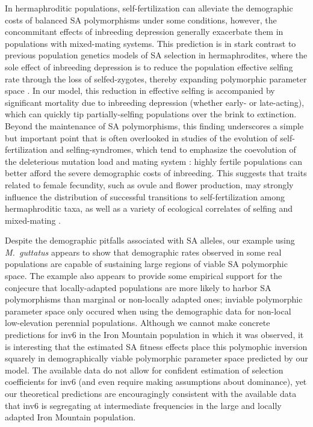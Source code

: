 \documentclass[11pt]{article}
\begin{document}
In hermaphroditic populations, self-fertilization can alleviate the demographic costs of balanced SA polymorphisms under some conditions, however, the concommitant effects of inbreeding depression generally exacerbate them in populations with mixed-mating systems. This prediction is in stark contrast to previous population genetics models of SA selection in hermaphrodites, where the sole effect of inbreeding depression is to reduce the population effective selfing rate through the loss of selfed-zygotes, thereby expanding polymorphic parameter space \citep{JordanConnallon2014, Olito2017}. In our model, this reduction in effective selfing is accompanied by significant mortality due to inbreeding depression (whether early- or late-acting), which can quickly tip partially-selfing populations over the brink to extinction. Beyond the maintenance of SA polymorphisms, this finding underscores a simple but important point that is often overlooked in studies of the evolution of self-fertilization and selfing-syndromes, which tend to emphasize the coevolution of the deleterious mutation load and mating system \citep[e.g.,][]{Charlesworth1987, LandeSchemske1985, Goodwillie2005}: highly fertile populations can better afford the severe demographic costs of inbreeding. This suggests that traits related to female fecundity, such as ovule and flower production, may strongly influence the distribution of successful transitions to self-fertilization among hermaphroditic taxa, as well as a variety of ecological correlates of selfing and mixed-mating \citep{Goodwillie2005, Igic2006, Grossenbacher2015}.

Despite the demographic pitfalls associated with SA alleles, our example using {\itshape M.~guttatus} appears to show that demographic rates observed in some real populations are capable of sustaining large regions of viable SA polymorphic space. The example also appears to provide some empirical support for the conjecure that locally-adapted populations are more likely to harbor SA polymorphisms than marginal or non-locally adapted ones; inviable polymorphic parameter space only occured when using the demographic data for non-local low-elevation perennial populations. Although we cannot make concrete predictions for inv6 in the Iron Mountain population in which it was observed, it is interesting that the estimated SA fitness effects place this polymophic inversion squarely in demographically viable polymorphic parameter space predicted by our model. The available data do not allow for confident estimation of selection coefficients for inv6 (and even require making assumptions about dominance), yet our theoretical predictions are encouragingly consistent with the available data that inv6 is segregating at intermediate frequencies in the large and locally adapted Iron Mountain population. 
\end{document}

